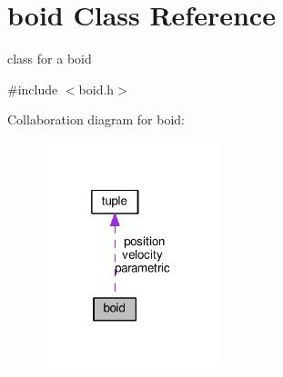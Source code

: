 \hypertarget{classboid}{}\section{boid Class Reference}
\label{classboid}


class for a boid  




{\ttfamily \#include $<$boid.\+h$>$}



Collaboration diagram for boid\+:
\nopagebreak
\begin{figure}[H]
\begin{center}
\leavevmode
\includegraphics[width=145pt]{classboid__coll__graph}
\end{center}
\end{figure}
